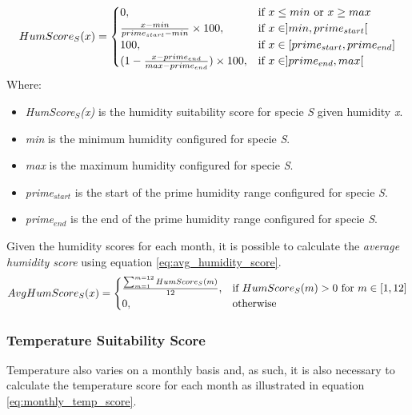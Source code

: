 \begin{equation}
\centering
HumScore_{S}(x) = 
\begin{cases}
    0, & \text{if } x \leq min \text{ or } x \geq max \\
    \frac{x - min}{prime_{start} - min} \times 100, & \text{if } x \in ]min,prime_{start}[ \\
    100, & \text{if } x \in [prime_{start},prime_{end}] \\
    (1 - \frac{x - prime_{end}}{max-prime_{end}}) \times 100, & \text{if } x \in ]prime_{end},max[ \\
\end{cases}
\label{eq:monthly_humidity_score}
\end{equation}
Where:
\begin{itemize}
\item \textit{HumScore$_{S}$(x)} is the humidity suitability score for specie \textit{S} given humidity \textit{x}.
\item \textit{min} is the minimum humidity configured for specie \textit{S}.
\item \textit{max} is the maximum humidity configured for specie \textit{S}.
\item \textit{prime$_{start}$} is the start of the prime humidity range configured for specie \textit{S}.
\item \textit{prime$_{end}$} is the end of the prime humidity range configured for specie \textit{S}.
\end{itemize}

Given the humidity scores for each month, it is possible to calculate the \textit{average humidity score} using equation \ref{eq:avg_humidity_score}. 
\begin{equation}
\centering
AvgHumScore_{S}(x) =
\begin{cases}
	\frac{\sum_{m=1}^{m=12} HumScore_{S}(m)}{12}, & \text{if } HumScore_{S}(m) > 0 \text{ for } m \in [1,12] \\
    0,              & \text{otherwise}
\end{cases}
\label{eq:avg_humidity_score}
\end{equation}

\subsubsection{Temperature Suitability Score}

Temperature also varies on a monthly basis and, as such, it is also necessary to calculate the temperature score for each month as illustrated in equation \ref{eq:monthly_temp_score}.

